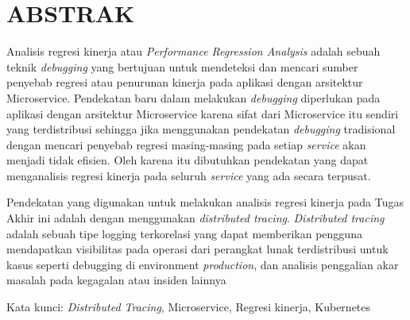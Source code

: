 \clearpage
\chapter*{ABSTRAK}

Analisis regresi kinerja atau \textit{Performance Regression Analysis} adalah sebuah teknik \textit{debugging} yang bertujuan untuk mendeteksi dan mencari sumber penyebab regresi atau penurunan kinerja pada aplikasi dengan arsitektur Microservice. Pendekatan baru dalam melakukan \textit{debugging} diperlukan pada aplikasi dengan arsitektur Microservice karena sifat dari Microservice itu sendiri yang terdistribusi sehingga jika menggunakan pendekatan \textit{debugging} tradisional dengan mencari penyebab regresi masing-masing pada setiap \textit{service} akan menjadi tidak efisien. Oleh karena itu dibutuhkan pendekatan yang dapat menganalisis regresi kinerja pada seluruh \textit{service} yang ada secara terpusat. 

Pendekatan yang digunakan untuk melakukan analisis regresi kinerja pada Tugas Akhir ini adalah dengan menggunakan \textit{distributed tracing}. \textit{Distributed tracing} adalah sebuah tipe logging terkorelasi yang dapat memberikan pengguna mendapatkan visibilitas pada operasi dari perangkat lunak terdistribusi untuk kasus seperti debugging di environment \textit{production}, dan analisis penggalian akar masalah pada kegagalan atau insiden lainnya

%
%





\vspace{15mm}
Kata kunci: \textit{Distributed Tracing}, Microservice, Regresi kinerja, Kubernetes
\clearpage